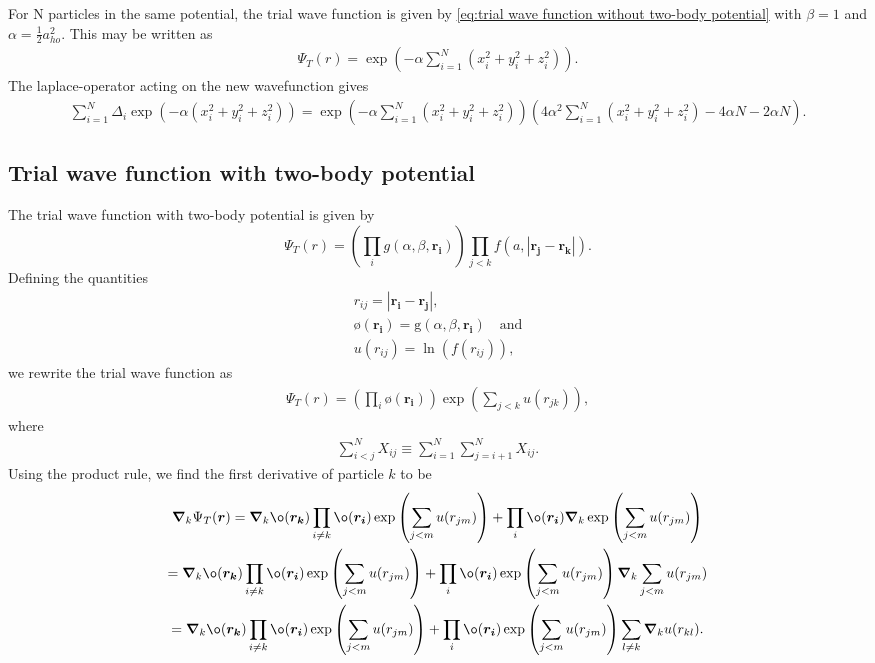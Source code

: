 For N particles in the same potential, the trial wave function is given by \autoref{eq:trial wave function without two-body potential} 
with $\beta =1$ and $\alpha =\frac{1}{2}a^2 _{ho}$. This may be written as
\begin{gather*}
\Psi_T(r) = \exp(-\alpha \sum_{i=1}^N (x_i^2 + y_i^2 + z_i^2)) .
\end{gather*}
The laplace-operator acting on the new wavefunction gives 
\begin{gather*}
	\sum_{i=1}^{N} \Delta _{i} \exp(-\alpha (x_i^2+y_i^2+z_i^2)) = \exp(-\alpha \sum_{i=1}^N (x_i^2 + y_i^2 + z_i^2)) \left(4\alpha^2 \sum_{i=1}^N 
	(x_i^2+y_i^2+z_i^2) - 4 \alpha N -2\alpha N \right).
\end{gather*}

\subsection{Trial wave function with two-body potential}
\label{sec:Trial wave function with two-body potential}
The trial wave function with two-body potential is given by
\begin{equation}
\label{eq:trial wave function with two-body potential}
	\Psi_T(r) = \left( \prod_{i}^{}g(\alpha ,\beta ,\boldsymbol{r_i})\right) \prod_{j<k}^{} f(a,|\boldsymbol{r_j-r_k}|).
\end{equation}
Defining the quantities 
\begin{gather*}
	r _{ij} = |\boldsymbol{r_i-r_j}|,\\ 
	ø(\boldsymbol{r_i})=\text{g}(\alpha ,\beta ,\boldsymbol{r_i})\quad \text{and}\\
	u(r _{ij})= \ln(f(r _{ij})),
\end{gather*}
we rewrite the trial wave function as
\begin{gather*}
\Psi_T(r) = \left( \prod_{i}^{}ø(\boldsymbol{r_i})\right) \exp\left(\sum_{j<k}^{} u(r _{jk})\right),
\end{gather*}
where 
\begin{gather*}
\sum_{i<j}^{N} X _{ij}\equiv \sum_{i=1}^{N} \sum_{j=i+1}^{N} X _{ij}. 
\end{gather*}
Using the product rule, we find the first derivative of particle $k$ to be
\begin{gather*}
\grad _{k} \Psi _{T}(\boldsymbol{r}) = \grad _{k}ø(\boldsymbol{r_k})\prod_{i\neq k}^{}ø(\boldsymbol{r_i})\exp\left(\sum_{j<m}^{} u(r _{jm})\right) + \prod_{i}^{}ø(\boldsymbol{r_i})\grad _k\exp\left(\sum_{j<m}^{} u(r _{jm})\right)\\
= \grad _{k}ø(\boldsymbol{r_k})\prod_{i\neq k}^{}ø(\boldsymbol{r_i})\exp\left(\sum_{j<m}^{} u(r _{jm})\right) + \prod_{i}^{}ø(\boldsymbol{r_i})\exp\left(\sum_{j<m}^{} u(r _{jm})\right)\grad_k \sum_{j<m}^{} u(r _{jm})\\
= \grad _{k}ø(\boldsymbol{r_k})\prod_{i\neq k}^{}ø(\boldsymbol{r_i})\exp\left(\sum_{j<m}^{} u(r _{jm})\right) + \prod_{i}^{}ø(\boldsymbol{r_i})\exp\left(\sum_{j<m}^{} u(r _{jm})\right) \sum_{l \neq  k} \boldsymbol{\nabla} _ku(r _{kl}). 
\end{gather*}
